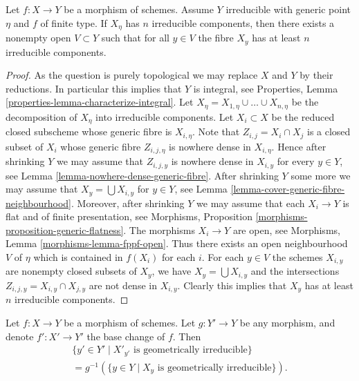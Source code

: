 \begin{lemma}
\label{lemma-irreducible-components-in-neighbourhood}
Let $f : X \to Y$ be a morphism of schemes. Assume $Y$ irreducible with
generic point $\eta$ and $f$ of finite type. If $X_\eta$ has $n$
irreducible components, then there exists a nonempty open $V \subset Y$
such that for all $y \in V$ the fibre $X_y$ has at least $n$
irreducible components.
\end{lemma}

\begin{proof}
As the question is purely topological we may replace $X$ and $Y$ by
their reductions. In particular this implies that $Y$ is integral, see
Properties, Lemma \ref{properties-lemma-characterize-integral}.
Let $X_\eta = X_{1, \eta} \cup \ldots \cup X_{n, \eta}$
be the decomposition of $X_\eta$ into irreducible components.
Let $X_i \subset X$ be the reduced closed subscheme whose generic
fibre is $X_{i, \eta}$. Note that $Z_{i, j} = X_i \cap X_j$
is a closed subset of $X_i$ whose generic fibre $Z_{i, j, \eta}$
is nowhere dense in $X_{i, \eta}$. Hence after shrinking $Y$ we may
assume that $Z_{i, j, y}$
is nowhere dense in $X_{i, y}$ for every $y \in Y$, see
Lemma \ref{lemma-nowhere-dense-generic-fibre}.
After shrinking $Y$ some more we may assume that
$X_y = \bigcup X_{i, y}$ for $y \in Y$, see
Lemma \ref{lemma-cover-generic-fibre-neighbourhood}.
Moreover, after shrinking $Y$ we may assume that each $X_i \to Y$
is flat and of finite presentation, see
Morphisms, Proposition \ref{morphisms-proposition-generic-flatness}.
The morphisms $X_i \to Y$ are open, see
Morphisms, Lemma \ref{morphisms-lemma-fppf-open}.
Thus there exists an open neighbourhood $V$ of $\eta$ which is contained
in $f(X_i)$ for each $i$.
For each $y \in V$ the schemes $X_{i, y}$ are
nonempty closed subsets of $X_y$, we have $X_y = \bigcup X_{i, y}$
and the intersections $Z_{i, j, y} = X_{i, y} \cap X_{j, y}$
are not dense in $X_{i, y}$. Clearly this implies that
$X_y$ has at least $n$ irreducible components.
\end{proof}

\begin{lemma}
\label{lemma-base-change-fibres-geometrically-irreducible}
Let $f : X \to Y$ be a morphism of schemes.
Let $g : Y' \to Y$ be any morphism, and denote
$f' : X' \to Y'$ the base change of $f$.
Then
\begin{align*}
\{y' \in Y' \mid X'_{y'}\text{ is geometrically irreducible}\} \\
= g^{-1}(\{y \in Y \mid X_y\text{ is geometrically irreducible}\}).
\end{align*}
\end{lemma}

